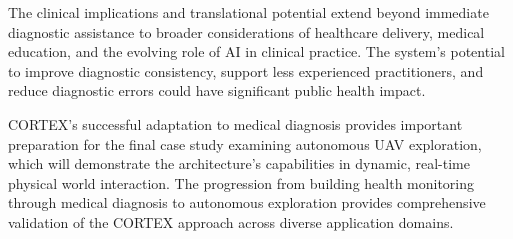The clinical implications and translational potential extend beyond immediate diagnostic assistance to broader considerations of healthcare delivery, medical education, and the evolving role of AI in clinical practice. The system's potential to improve diagnostic consistency, support less experienced practitioners, and reduce diagnostic errors could have significant public health impact.

CORTEX's successful adaptation to medical diagnosis provides important preparation for the final case study examining autonomous UAV exploration, which will demonstrate the architecture's capabilities in dynamic, real-time physical world interaction. The progression from building health monitoring through medical diagnosis to autonomous exploration provides comprehensive validation of the CORTEX approach across diverse application domains.